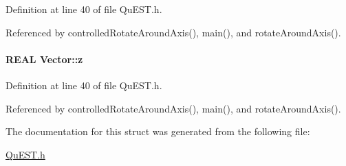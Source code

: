 Definition at line 40 of file QuEST.h.

Referenced by controlledRotateAroundAxis(), main(), and rotateAroundAxis().\hypertarget{structVector_ad4e863651be7d6b7e2b28cd7445a0ccf}{
\paragraph[{z}]{\setlength{\rightskip}{0pt plus 5cm}REAL {\bf Vector::z}}\hfill}
\label{structVector_ad4e863651be7d6b7e2b28cd7445a0ccf}


Definition at line 40 of file QuEST.h.

Referenced by controlledRotateAroundAxis(), main(), and rotateAroundAxis().

The documentation for this struct was generated from the following file:\begin{DoxyCompactItemize}
\item 
\hyperlink{QuEST_8h}{QuEST.h}\end{DoxyCompactItemize}
